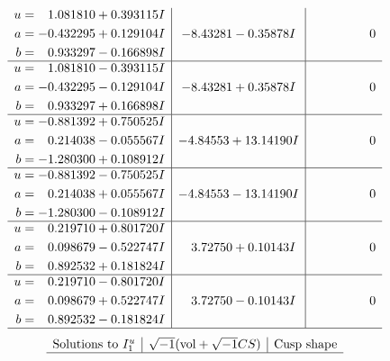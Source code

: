 \documentclass[1p]{elsarticle_modified}
\theoremstyle{definition}
\newcommand{\I}{\sqrt{-1}}
\begin{document}
$$\begin{array}{c|c|c}
\begin{aligned}
u &= \phantom{-}1.081810 + 0.393115 I \\
a &= -0.432295 + 0.129104 I \\
b &= \phantom{-}0.933297 - 0.166898 I\end{aligned}
 & -8.43281 - 0.35878 I & \phantom{-0.000000 } 0 \\ \hline\begin{aligned}
u &= \phantom{-}1.081810 - 0.393115 I \\
a &= -0.432295 - 0.129104 I \\
b &= \phantom{-}0.933297 + 0.166898 I\end{aligned}
 & -8.43281 + 0.35878 I & \phantom{-0.000000 } 0 \\ \hline\begin{aligned}
u &= -0.881392 + 0.750525 I \\
a &= \phantom{-}0.214038 - 0.055567 I \\
b &= -1.280300 + 0.108912 I\end{aligned}
 & -4.84553 + 13.14190 I & \phantom{-0.000000 } 0 \\ \hline\begin{aligned}
u &= -0.881392 - 0.750525 I \\
a &= \phantom{-}0.214038 + 0.055567 I \\
b &= -1.280300 - 0.108912 I\end{aligned}
 & -4.84553 - 13.14190 I & \phantom{-0.000000 } 0 \\ \hline\begin{aligned}
u &= \phantom{-}0.219710 + 0.801720 I \\
a &= \phantom{-}0.098679 - 0.522747 I \\
b &= \phantom{-}0.892532 + 0.181824 I\end{aligned}
 & \phantom{-}3.72750 + 0.10143 I & \phantom{-0.000000 } 0 \\ \hline\begin{aligned}
u &= \phantom{-}0.219710 - 0.801720 I \\
a &= \phantom{-}0.098679 + 0.522747 I \\
b &= \phantom{-}0.892532 - 0.181824 I\end{aligned}
 & \phantom{-}3.72750 - 0.10143 I & \phantom{-0.000000 } 0\\
 \hline 
 \end{array}$$\newpage$$\begin{array}{c|c|c}  
\text{Solutions to }I^u_{1}& \I (\text{vol} + \sqrt{-1}CS) & \text{Cusp shape}\\
 \hline 

\end{array}$$
\end{document}

